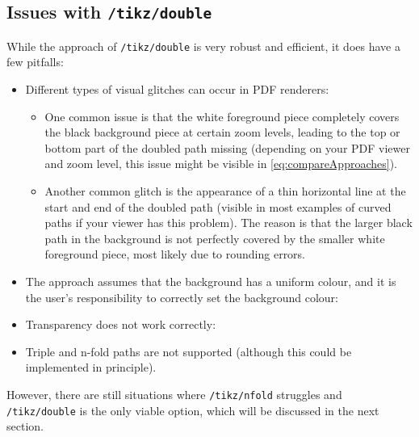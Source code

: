 \documentclass[12pt,a4paper]{article}
\theoremstyle{definition}
\newcommand{\tikzdouble}{\texttt{/tikz/double}}
\newcommand{\tikznfold}{\texttt{/tikz/nfold}}
\begin{document}
\subsection{Issues with \tikzdouble}
While the approach of \tikzdouble{} is very robust and efficient, it does have a few pitfalls:
\begin{itemize}
  \item Different types of visual glitches can occur in PDF renderers:
  \begin{itemize}
    \item One common issue is that the white foreground piece completely covers the black background piece at certain zoom levels, leading to the top or bottom part of the doubled path missing (depending on your PDF viewer and zoom level, this issue might be visible in \cref{eq:compareApproaches}).
    \item Another common glitch is the appearance of a thin horizontal line at the start and end of the doubled path (visible in most examples of curved paths if your viewer has this problem). The reason is that the larger black path in the background is not perfectly covered by the smaller white foreground piece, most likely due to rounding errors.
  \end{itemize}
  \item The approach assumes that the background has a uniform colour, and it is the user's responsibility to correctly set the background colour:
\begin{tkzexample}[latex=3.5cm]
\end{tkzexample}
  \item Transparency does not work correctly:
\begin{tkzexample}[latex=3.5cm]
\end{tkzexample}
  \item Triple and n-fold paths are not supported (although this could be implemented in principle).
\end{itemize}
However, there are still situations where \tikznfold{} struggles and \tikzdouble{} is the only viable option, which will be discussed in the next section.
\end{document}
